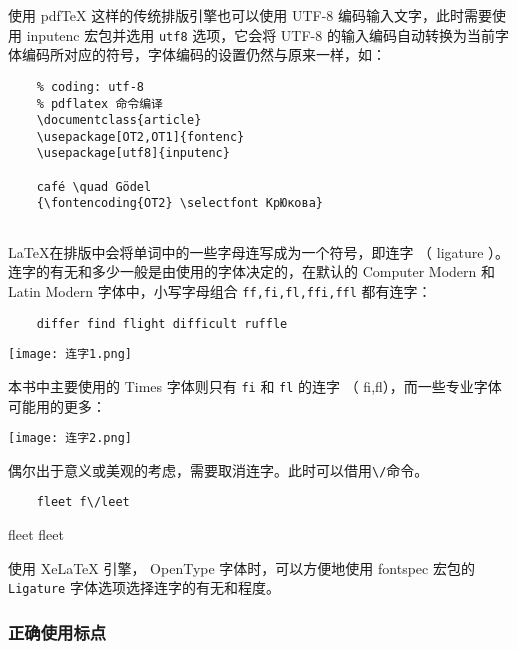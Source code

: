使用 pdfTeX 这样的传统排版引擎也可以使用 UTF-8 编码输入文字，此时需要使用 inputenc 宏包并选用 \verb|utf8| 选项，它会将 UTF-8 的输入编码自动转换为当前字体编码所对应的符号，字体编码的设置仍然与原来一样，如：
\begin{lstlisting}
    % coding: utf-8
    % pdflatex 命令编译
    \documentclass{article}
    \usepackage[OT2,OT1]{fontenc}
    \usepackage[utf8]{inputenc}
    
    café \quad Gödel
    {\fontencoding{OT2} \selectfont КpЮковa}
    
\end{lstlisting}

\LaTeX 在排版中会将单词中的一些字母连写成为一个符号，即连字 （ ligature ）。连字的有无和多少一般是由使用的字体决定的，在默认的 Computer Modern 和 Latin Modern 字体中，小写字母组合 \verb|ff,fi,fl,ffi,ffl| 都有连字：

\begin{minipage}[t]{0.45\textwidth}
    \begin{lstlisting}
    differ find flight difficult ruffle 
    \end{lstlisting}
\end{minipage}
\hfill
\begin{minipage}[c]{0.45\textwidth}
    \hspace{0.5cm}
    \texttt{[image: 连字1.png]}
\end{minipage}

本书中主要使用的 Times 字体则只有 \verb|fi| 和 \verb|fl| 的连字 （ fi,fl），而一些专业字体可能用的更多：

\texttt{[image: 连字2.png]}

偶尔出于意义或美观的考虑，需要取消连字。此时可以借用\verb|\/|命令。

\begin{minipage}[t]{0.45\textwidth}
    \begin{lstlisting}
    fleet f\/leet
    \end{lstlisting}
\end{minipage}
\hfill
\begin{minipage}[b]{0.45\textwidth}
    \hspace{0.5cm}

    fleet f\/leet
\end{minipage}

使用 XeLaTeX 引擎， OpenType 字体时，可以方便地使用 fontspec 宏包的 \verb|Ligature| 字体选项选择连字的有无和程度。

\subsubsection{正确使用标点}

